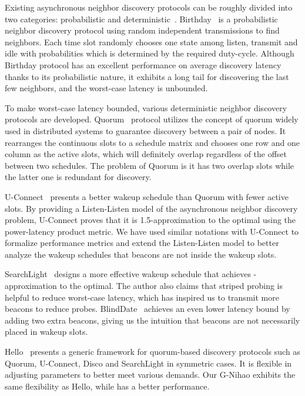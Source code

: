 \documentclass[conference]{IEEEtran}
\begin{document}
Existing asynchronous neighbor discovery protocols can be roughly divided into two categories: probabilistic and deterministic~\cite{sun2014ndsurvey}.
Birthday~\cite{mcglynn2001birthday} is a probabilistic neighbor discovery protocol using random independent transmissions to find neighbors.
Each time slot randomly chooses one state among listen, transmit and idle with probabilities which is determined by the required duty-cycle.
Although Birthday protocol has an excellent performance on average discovery latency thanks to its probabilistic nature, 
it exhibits a long tail for discovering the last few neighbors, and the worst-case latency is unbounded.

To make worst-case latency bounded, various deterministic neighbor discovery protocols are developed.
Quorum~\cite{tseng2003power} protocol utilizes the concept of quorum widely used in distributed systems to guarantee discovery between a pair of nodes.
It rearranges the continuous  slots to a schedule matrix and chooses one row and one column as the active slots,
which will definitely overlap regardless of the offset between two schedules.
The problem of Quorum is it has two overlap slots while the latter one is redundant for discovery.

U-Connect~\cite{kandhalu2010u} presents a better wakeup schedule than Quorum with fewer active slots.
By providing a Listen-Listen model of the asynchronous neighbor discovery problem,
U-Connect proves that it is 1.5-approximation to the optimal using the power-latency product metric.
We have used similar notations with U-Connect to formalize performance metrics and
extend the Listen-Listen model to better analyze the wakeup schedules that beacons are not inside the wakeup slots.

SearchLight~\cite{bakht2012mobicom} designs a more effective wakeup schedule that achieves -approximation to the optimal.
The author also claims that striped probing is helpful to reduce worst-case latency, which has inspired us to transmit more beacons to reduce probes.
BlindDate~\cite{wang2015blinddate} achieves an even lower latency bound by adding two extra beacons, giving us the intuition that beacons are not necessarily placed in wakeup slots.

Hello~\cite{sun2014hello} presents a generic framework for quorum-based discovery protocols such as Quorum, U-Connect, Disco and SearchLight in symmetric cases.
It is flexible in adjusting parameters to better meet various demands. Our G-Nihao exhibits the same flexibility as Hello,
while has a better performance.
\end{document}
